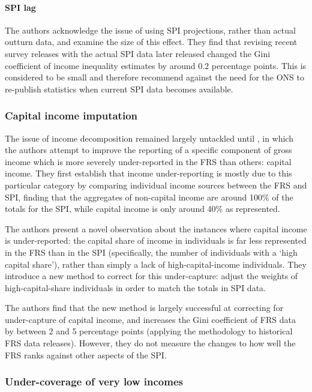 \documentclass[10pt,journal,compsoc]{IEEEtran}
\begin{document}
\paragraph{SPI lag} The authors acknowledge the issue of using SPI projections, rather than actual outturn data, and examine the size of this effect. They find that revising recent survey releases with the actual SPI data later released changed the Gini coefficient of income inequality estimates by around 0.2 percentage points. This is considered to be small and therefore recommend against the need for the ONS to re-publish statistics when current SPI data becomes available.

\subsubsection{Capital income imputation}

The issue of income decomposition remained largely untackled until \cite{frs_capital_income}, in which the authors attempt to improve the reporting of a specific component of gross income which is more severely under-reported in the FRS than others: capital income. They first establish that income under-reporting is mostly due to this particular category by comparing individual income sources between the FRS and SPI, finding that the aggregates of non-capital income are around 100\% of the totals for the SPI, while capital income is only around 40\% as represented.

The authors present a novel observation about the instances where capital income is under-reported: the capital share of income in individuals is far less represented in the FRS than in the SPI (specifically, the number of individuals with a `high capital share'), rather than simply a lack of high-capital-income individuals. They introduce a new method to correct for this under-capture: adjust the weights of high-capital-share individuals in order to match the totals in SPI data.

The authors find that the new method is largely successful at correcting for under-capture of capital income, and increases the Gini coefficient of FRS data by between 2 and 5 percentage points (applying the methodology to historical FRS data releases). However, they do not measure the changes to how well the FRS ranks against other aspects of the SPI.

\subsubsection{Under-coverage of very low incomes}
\end{document}
